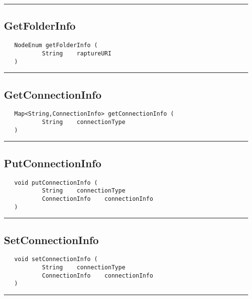 \rule{15cm}{2pt}
\subsection{GetFolderInfo}
\label{Api:GetFolderInfo}
\begin{verbatim}
   NodeEnum getFolderInfo (
           String    raptureURI
   )
\end{verbatim}



\rule{15cm}{2pt}
\subsection{GetConnectionInfo}
\label{Api:GetConnectionInfo}
\begin{verbatim}
   Map<String,ConnectionInfo> getConnectionInfo (
           String    connectionType
   )
\end{verbatim}



\rule{15cm}{2pt}
\subsection{PutConnectionInfo}
\label{Api:PutConnectionInfo}
\begin{verbatim}
   void putConnectionInfo (
           String    connectionType
           ConnectionInfo    connectionInfo
   )
\end{verbatim}



\rule{15cm}{2pt}
\subsection{SetConnectionInfo}
\label{Api:SetConnectionInfo}
\begin{verbatim}
   void setConnectionInfo (
           String    connectionType
           ConnectionInfo    connectionInfo
   )
\end{verbatim}



\rule{15cm}{2pt}
